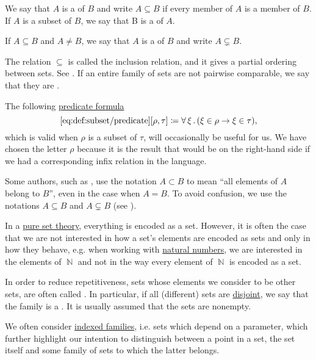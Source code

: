 \begin{definition}\label{def:subset}
  We say that \( A \) is a  of \( B \) and write \( A \subseteq B \) if every member of \( A \) is a member of \( B \). If \( A \) is a subset of \( B \), we say that B is a  of \( A \).

  If \( A \subseteq B \) and \( A \neq B \), we say that \( A \) is a  of \( B \) and write \( A \subsetneq B \).

  The relation \( \subseteq \) is called the inclusion relation, and it gives a partial ordering between sets. See . If an entire family of sets are not pairwise comparable, we say that they are .

  The following \hyperref[rem:predicate_formula]{predicate formula}
  \begin{equation*}\taglabel[\op{IsSubset}]{eq:def:subset/predicate}
    \ref{eq:def:subset/predicate}[\rho, \tau] \coloneqq \qforall \xi (\xi \in \rho \rightarrow \xi \in \tau),
  \end{equation*}
  which is valid when \( \rho \) is a subset of \( \tau \), will occasionally be useful for us. We have chosen the letter \( \rho \) because it is the result that would be on the right-hand side if we had a corresponding infix relation in the language.
\end{definition}

\begin{remark}\label{rem:subset_notation}
  Some authors, such as \cite{Kelley1955}, use the notation \( A \subset B \) to mean \enquote{all elements of \( A \) belong to \( B \)}, even in the case when \( A = B \). To avoid confusion, we use the notations \( A \subseteq B \) and \( A \subsetneq B \) (see ).
\end{remark}

\begin{remark}\label{rem:family_of_sets}
  In a \hyperref[rem:pure_set_theory]{pure set theory}, everything is encoded as a set. However, it is often the case that we are not interested in how a set's elements are encoded as sets and only in how they behave, e.g. when working with \hyperref[def:set_of_natural_numbers]{natural numbers}, we are interested in the elements of \( \BbbN \) and not in the way every element of \( \BbbN \) is encoded as a set.

  In order to reduce repetitiveness, sets whose elements we consider to be other sets, are often called . In particular, if all (different) sets are \hyperref[def:subset]{disjoint}, we say that the family is a . It is usually assumed that the sets are nonempty.

  We often consider \hyperref[def:tuple_and_cartesian_product/indexed_family]{indexed families}, i.e. sets which depend on a parameter, which further highlight our intention to distinguish between a point in a set, the set itself and some family of sets to which the latter belongs.
\end{remark}

